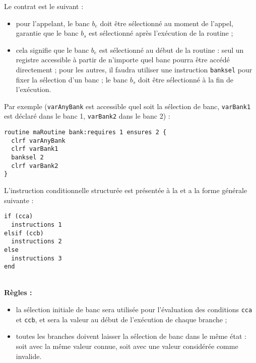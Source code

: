 
Le contrat est le suivant :
\begin{itemize}
  \item pour l'appelant, le banc $b_e$ doit être sélectionné au moment de l'appel, garantie que le banc $b_s$ est sélectionné après l'exécution de la routine ; 
  \item cela signifie que le banc $b_e$ est sélectionné au début de la routine : seul un registre accessible à partir de n'importe quel banc pourra être accédé directement ; pour les autres, il faudra utiliser une instruction \texttt{banksel} pour fixer la sélection d'un banc ; le banc $b_s$ doit être sélectionné à la fin de l'exécution.
\end{itemize}

Par exemple (\texttt{varAnyBank} est accessible quel soit la sélection de banc, \texttt{varBank1} est déclaré dans le banc 1, \texttt{varBank2} dans le banc 2) :
\begin{lstlisting}[language=piccolo]
routine maRoutine bank:requires 1 ensures 2 {
  clrf varAnyBank
  clrf varBank1
  banksel 2
  clrf varBank2
}
\end{lstlisting}










L'instruction conditionnelle structurée est présentée à la  et a la forme générale suivante :

\begin{lstlisting}[language=piccolo]
if (cca)
  instructions 1
elsif (ccb)
  instructions 2
else
  instructions 3
end
\end{lstlisting}

~\\
\textbf{Règles :}
\begin{itemize}
  \item la sélection initiale de banc sera utilisée pour l’évaluation des conditions \texttt{cca} et \texttt{ccb}, et sera la valeur au début de l'exécution de chaque branche ;
  \item toutes les branches doivent laisser la sélection de banc dans le même état : soit avec la même valeur connue, soit avec une valeur considérée comme invalide.
\end{itemize}

